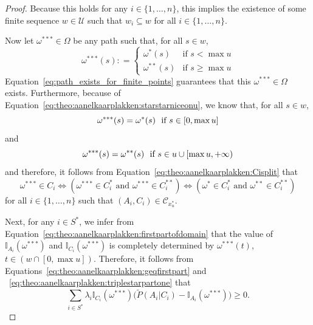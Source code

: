 \documentclass[10pt,a4paper]{paper}
\theoremstyle{definition}
\newcommand{\ind}[1]{\mathbb{I}_{#1}}
\newcommand{\coloneqq}{:\!=}
\begin{document}
\begin{proof}
Because this holds for any $i\in\{1,\ldots,n\}$, this implies the existence of some finite sequence $w\in\mathcal{U}$ such that $w_i\subseteq w$ for all $i\in\{1,\ldots,n\}$.

Now let $\omega^{***}\in\Omega$ be any path such that, for all $s\in w$,
\begin{equation*}%
\omega^{***}(s)\coloneqq
\begin{cases}
\omega^{*}(s) & \text{if $s<\max u$}\\
\omega^{**}(s) & \text{if $s\geq \max u$}
\end{cases}
\end{equation*}
Equation~\eqref{eq:path_exists_for_finite_points} guarantees that this $\omega^{***}\in\Omega$ exists. Furthermore, because of Equation~\eqref{eq:theo:aanelkaarplakken:starstarniceonu}, we know that, for all $s\in w$,
\begin{equation}\label{eq:theo:aanelkaarplakken:triplestarpartone}
\omega^{***}(s)=\omega^*(s)
\text{~~if $s\in [0,\max u]$}\vspace{-3mm}
\end{equation}
and
\begin{equation}\label{eq:theo:aanelkaarplakken:triplestarparttwo}
\omega^{***}(s)=\omega^{**}(s)
\text{~~if $s\in u\cup [\max u,+\infty)$}
\vspace{2mm}
\end{equation}
and therefore, it follows from Equation~\eqref{eq:theo:aanelkaarplakken:Cisplit} that
\begin{equation}\label{eq:theo:aanelkaarplakken:triplestarequivalence}
\omega^{***}\in C_i
\Leftrightarrow
(\omega^{***}\in C_i^*
\text{~and~}
\omega^{***}\in C_i^{**})
\Leftrightarrow
(\omega^{*}\in C_i^*
\text{~and~}
\omega^{**}\in C_i^{**})
\end{equation}
for all $i\in\{1,\dots,n\}$ such that $(A_i,C_i)\in\mathcal{C}_{x_u^*}$.


Next, for any $i\in S^*$, we infer from Equation~\eqref{eq:theo:aanelkaarplakken:firstpartofdomain} that the value of $\ind{A_i}(\omega^{***})$ and $\ind{C_i}(\omega^{***})$ is completely determined by $\omega^{***}(t)$, $t\in(w\cap[0,\max u])$. Therefore, it follows from Equations~\eqref{eq:theo:aanelkaarplakken:geqfirstpart} and ~\eqref{eq:theo:aanelkaarplakken:triplestarpartone} that 
\begin{equation}\label{eq:theo:aanelkaarplakken:geqfirstparttriplestar}
\sum_{i\in S^*}\lambda_i\ind{C_i}(\omega^{***})\bigl(\tilde{P}(A_i\vert C_i)-\ind{A_i}(\omega^{***})\bigr)
\geq0.
\end{equation}


\end{proof}
\end{document}
